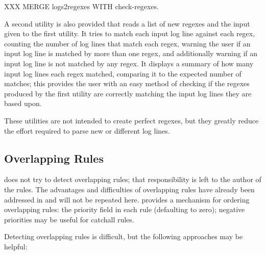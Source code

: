 XXX MERGE logs2regexes WITH check-regexes.

A second utility is also provided that reads a list of new regexes and
the input given to the first utility.  It tries to match each input log
line against each regex, counting the number of log lines that match
each regex, warning the user if an input log line is matched by more
than one regex, and additionally warning if an input log line is not
matched by any regex.  It displays a summary of how many input log lines
each regex matched, comparing it to the expected number of matches; this
provides the user with an easy method of checking if the regexes
produced by the first utility are correctly matching the input log lines
they are based upon.

These utilities are not intended to create perfect regexes, but they
greatly reduce the effort required to parse new or different log lines.

\subsection{Overlapping Rules}

\label{overlapping rules in implementation}

\parsername{} does not try to detect overlapping rules; that responsibility
is left to the author of the rules.  The advantages and difficulties of
overlapping rules have already been addressed in  and will not be repeated here.  \parsername{}
provides a mechanism for ordering overlapping rules: the priority field in
each rule (defaulting to zero); negative priorities may be useful for
catchall rules.

Detecting overlapping rules is difficult, but the following approaches may
be helpful:

